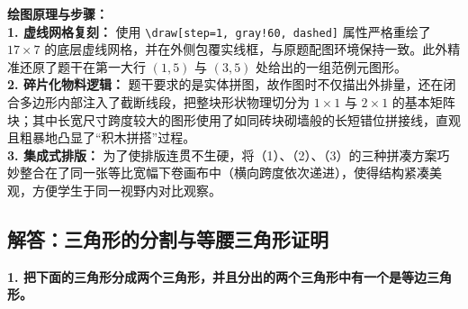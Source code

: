 \vspace{0.4cm}
{\small\color{blue!70!black}
\textbf{绘图原理与步骤：}\\
\textbf{1. 虚线网格复刻：} 使用 \texttt{\textbackslash draw[step=1, gray!60, dashed]} 属性严格重绘了 $17 \times 7$ 的底层虚线网格，并在外侧包覆实线框，与原题配图环境保持一致。此外精准还原了题干在第一大行 $(1,5)$ 与 $(3,5)$ 处给出的一组范例元图形。\\
\textbf{2. 碎片化物料逻辑：} 题干要求的是实体拼图，故作图时不仅描出外排量，还在闭合多边形内部注入了截断线段，把整块形状物理切分为 $1\times 1$ 与 $2\times 1$ 的基本矩阵块；其中长宽尺寸跨度较大的图形使用了如同砖块砌墙般的长短错位拼接线，直观且粗暴地凸显了“积木拼搭”过程。\\
\textbf{3. 集成式排版：} 为了使排版连贯不生硬，将（1）、（2）、（3）的三种拼凑方案巧妙整合在了同一张等比宽幅下卷画布中（横向跨度依次递进），使得结构紧凑美观，方便学生于同一视野内对比观察。
}

\newpage

\newpage

\subsection{解答：三角形的分割与等腰三角形证明}

\vspace{0.4cm}

\noindent\textbf{1. 把下面的三角形分成两个三角形，并且分出的两个三角形中有一个是等边三角形。}

\vspace{0.6cm}

